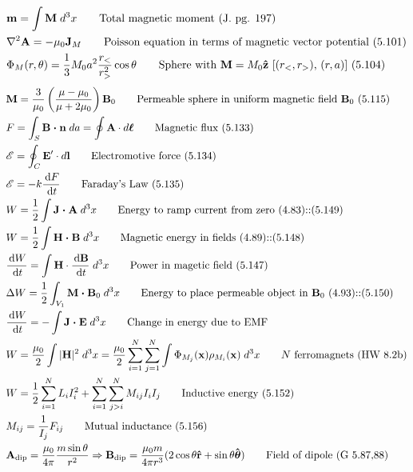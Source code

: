 \documentclass[10pt]{article}
\newcommand{\rhat}{\boldsymbol{\hat{\textbf{r}}}}
\newcommand{\zhat}{\boldsymbol{\hat{\textbf{z}}}}
\newcommand{\thetahat}{\boldsymbol{\hat{\textbf{$\theta$}}}}
\newcommand{\ve}[1]{\boldsymbol{\mathbf{#1}}}
\newcommand{\vect}[1]{\boldsymbol{\mathbf{#1}}}
\newcommand{\dd}{\, \mathrm{d}}
\newcommand{\tder}[2]{\frac{\dd #1}{\dd #2}}
\begin{document}
\begin{multicols}{2}
\begin{align*}
		& \ve{m} = \int \ve{M} \; d^3 x \tag*{Total magnetic moment (J. pg. 197)} \\
		& \nabla^2 \vect{A} = -\mu_0 \vect{J}_M \tag*{Poisson equation in terms of magnetic vector potential (5.101)} \\
		& \Phi_M(r,\theta) = \frac{1}{3} M_0 a^2 \frac{r_<}{r_>^2} \cos \theta \tag*{Sphere with $\ve{M} = M_0 \zhat$ [$(r_<,r_>)$, $(r,a)$] (5.104)} \\
	\end{align*}
	\setlength{\abovedisplayskip}{-25pt}
	\setlength{\belowdisplayskip}{0pt}
	\setlength{\abovedisplayshortskip}{0pt}
	\setlength{\belowdisplayshortskip}{0pt}
	\begin{align*} 
		& \vect{M} = \frac{3}{\mu_0} \left( \frac{\mu - \mu_0}{\mu + 2 \mu_0} \right) \vect{B}_0 \tag*{Permeable sphere in uniform magnetic field $\ve{B}_0$ (5.115)} \\
		& F = \int_S \vect{B \cdot n} \; da = \oint \ve{A} \cdot d \ve{\ell} \tag*{Magnetic flux (5.133)} \\
		& \mathscr{E} = \oint_C \vect{E}' \cdot d \vect{l} \tag*{Electromotive force (5.134)} \\
		& \mathscr{E} = -k \tder{F}{t} \tag*{Faraday's Law (5.135)} \\
		& W = \frac{1}{2} \int \vect{J \cdot A} \; d^3 x  \tag*{Energy to ramp current from zero (4.83)::(5.149)} \\
		& W = \frac{1}{2} \int \vect{H \cdot B} \; d^3 x \tag*{Magnetic energy in fields (4.89)::(5.148)} \\
		& \tder{W}{t} = \int \ve{H} \cdot \tder{\ve{B}}{t} \; d^3 x \tag*{Power in magetic field (5.147)} \\
		& \Delta W = \frac{1}{2} \int_{V_1} \vect{M \cdot B}_0 \; d^3 x \tag*{Energy to place permeable object in $\ve{B}_0$ (4.93)::(5.150)} \\
		& \tder{W}{t} = - \int \ve{J \cdot E} \; d^3 x \tag*{Change in energy due to EMF} \\
		& W = \frac{\mu_0}{2} \int |\ve{H}|^2 \; d^3 x = \frac{\mu_0}{2} \sum_{i=1}^{N} \sum_{j=1}^{N} \int \Phi_{M_j}(\ve{x}) \rho_{M_i}(\ve{x}) \; d^3 x \tag*{$N$ ferromagnets (HW 8.2b)} \\
		& W = \frac{1}{2} \sum_{i=1}^N L_i I_i^2 + \sum_{i=1}^N \sum_{j>i}^N M_{ij} I_i I_j \tag*{Inductive energy (5.152)} \\
		& M_{ij} = \frac{1}{I_j} F_{ij} \tag*{Mutual inductance (5.156)} \\
		&\ve{A}_{\text{dip}} = \frac{\mu_0}{4 \pi} \frac{m \sin \theta}{r^2} \Rightarrow \ve{B}_{\text{dip}} = \frac{\mu_0 m}{4 \pi r^3}(2 \cos \theta \rhat + \sin \theta \thetahat) \tag*{Field of dipole (G 5.87,88)} \\

\end{align*}
\end{multicols}
\end{document}
